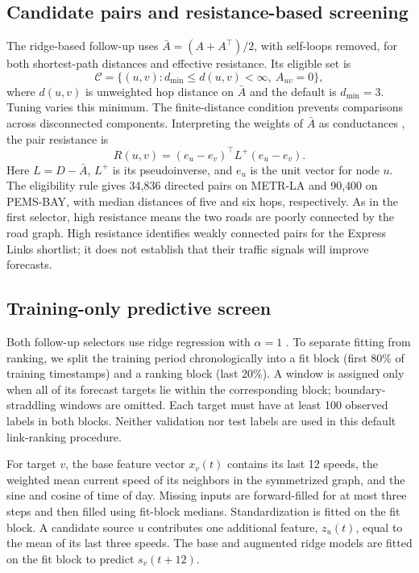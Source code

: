 \documentclass[journal]{IEEEtran}
\begin{document}
\subsection{Candidate pairs and resistance-based screening}
The ridge-based follow-up uses $\bar A=(A+A^\top)/2$, with self-loops removed, for both shortest-path distances and effective resistance. Its eligible set is
\begin{equation}
\mathcal C=\{(u,v):d_{\min}\leq d(u,v)<\infty,\ A_{uv}=0\},
\label{eq:candidates}
\end{equation}
where $d(u,v)$ is unweighted hop distance on $\bar A$ and the default is $d_{\min}=3$. Tuning varies this minimum. The finite-distance condition prevents comparisons across disconnected components. Interpreting the weights of $\bar A$ as conductances \cite{klein1993resistance,spielman2011sparsification}, the pair resistance is
\begin{equation}
R(u,v)=(e_u-e_v)^{\top}L^{+}(e_u-e_v).
\end{equation}
Here $L=D-\bar A$, $L^+$ is its pseudoinverse, and $e_u$ is the unit vector for node $u$. The eligibility rule gives 34{,}836 directed pairs on METR-LA and 90{,}400 on PEMS-BAY, with median distances of five and six hops, respectively. As in the first selector, high resistance means the two roads are poorly connected by the road graph. High resistance identifies weakly connected pairs for the Express Links shortlist; it does not establish that their traffic signals will improve forecasts.

\subsection{Training-only predictive screen}
Both follow-up selectors use ridge regression with $\alpha=1$ \cite{hoerl1970ridge}. To separate fitting from ranking, we split the training period chronologically into a fit block (first 80\% of training timestamps) and a ranking block (last 20\%). A window is assigned only when all of its forecast targets lie within the corresponding block; boundary-straddling windows are omitted. Each target must have at least 100 observed labels in both blocks. Neither validation nor test labels are used in this default link-ranking procedure.

For target $v$, the base feature vector $x_v(t)$ contains its last 12 speeds, the weighted mean current speed of its neighbors in the symmetrized graph, and the sine and cosine of time of day. Missing inputs are forward-filled for at most three steps and then filled using fit-block medians. Standardization is fitted on the fit block. A candidate source $u$ contributes one additional feature, $z_u(t)$, equal to the mean of its last three speeds. The base and augmented ridge models are fitted on the fit block to predict $s_v(t+12)$.
\end{document}
